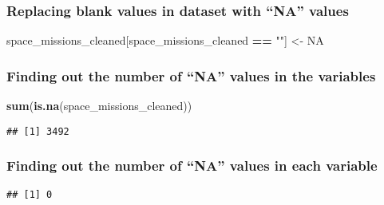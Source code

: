 \documentclass[
]{article}
\newenvironment{Shaded}{\begin{snugshade}}{\end{snugshade}}
\newcommand{\ConstantTok}[1]{\textcolor[rgb]{0.56,0.35,0.01}{#1}}
\newcommand{\FunctionTok}[1]{\textcolor[rgb]{0.13,0.29,0.53}{\textbf{#1}}}
\newcommand{\NormalTok}[1]{#1}
\newcommand{\OtherTok}[1]{\textcolor[rgb]{0.56,0.35,0.01}{#1}}
\newcommand{\SpecialCharTok}[1]{\textcolor[rgb]{0.81,0.36,0.00}{\textbf{#1}}}
\newcommand{\StringTok}[1]{\textcolor[rgb]{0.31,0.60,0.02}{#1}}
\begin{document}
\hypertarget{replacing-blank-values-in-dataset-with-na-values}{%
\subsubsection{Replacing blank values in dataset with ``NA''
values}\label{replacing-blank-values-in-dataset-with-na-values}}

\begin{Shaded}
\begin{Highlighting}[]
\NormalTok{space\_missions\_cleaned[space\_missions\_cleaned }\SpecialCharTok{==} \StringTok{""}\NormalTok{] }\OtherTok{\textless{}{-}} \ConstantTok{NA}
\end{Highlighting}
\end{Shaded}

\hypertarget{finding-out-the-number-of-na-values-in-the-variables}{%
\subsubsection{Finding out the number of ``NA'' values in the
variables}\label{finding-out-the-number-of-na-values-in-the-variables}}

\begin{Shaded}
\begin{Highlighting}[]
\FunctionTok{sum}\NormalTok{(}\FunctionTok{is.na}\NormalTok{(space\_missions\_cleaned))}
\end{Highlighting}
\end{Shaded}

\begin{verbatim}
## [1] 3492
\end{verbatim}

\hypertarget{finding-out-the-number-of-na-values-in-each-variable}{%
\subsubsection{Finding out the number of ``NA'' values in each
variable}\label{finding-out-the-number-of-na-values-in-each-variable}}

\begin{Shaded}
\end{Shaded}

\begin{verbatim}
## [1] 0
\end{verbatim}
\end{document}
